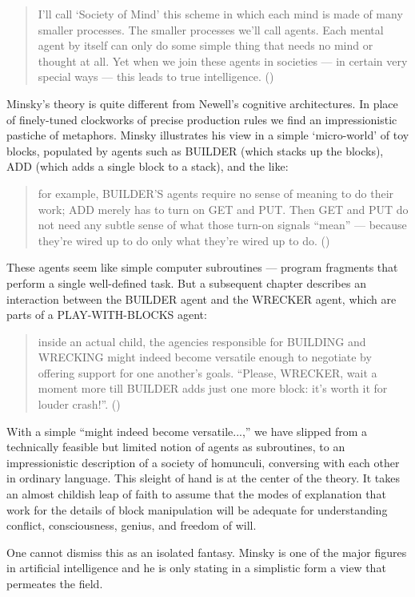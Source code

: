 \documentclass[12pt]{article}
\def\bq{\begin{quote}}
\def\eq{\end{quote}}
\begin{document}
\bq
I'll call `Society of Mind' this scheme in which each mind is made of many smaller processes. The smaller processes we'll call agents. Each mental agent by itself can only do some simple thing that needs no mind or thought at all. Yet when we join these agents in societies --- in certain very special ways --- this leads to true intelligence. ({\cite{minsky1986}})
\eq

Minsky's theory is quite different from Newell's cognitive architectures. In place of finely-tuned clockworks of precise production rules we find an impressionistic pastiche of metaphors. Minsky illustrates his view in a simple `micro-world' of toy blocks, populated by agents such as BUILDER (which stacks up the blocks), ADD (which adds a single block to a stack), and the like:

\bq
for example, BUILDER'S agents require no sense of meaning to do their work; ADD merely has to turn on GET and PUT. Then GET and PUT do not need any subtle sense of what those turn-on signals ``mean'' --- because they're wired up to do only what they're wired up to do. ({\it \cite{minsky1986}})
\eq

These agents seem like simple computer subroutines --- program fragments that perform a single well-defined task. But a subsequent chapter describes an interaction between the BUILDER agent and the WRECKER agent, which are parts of a PLAY-WITH-BLOCKS agent:

\bq
inside an actual child, the agencies responsible for BUILDING and WRECKING might indeed become versatile enough to negotiate by offering support for one another's goals. ``Please, WRECKER, wait a moment more till BUILDER adds just one more block: it's worth it for louder crash!''. ({\it \cite{minsky1986}})
\eq

With a simple ``might indeed become versatile...,'' we have slipped from a technically feasible but limited notion of agents as subroutines, to an impressionistic description of a society of homunculi, conversing with each other in ordinary language. This sleight of hand is at the center of the theory. It takes an almost childish leap of faith to assume that the modes of
explanation that work for the details of block manipulation will be adequate for understanding conflict, consciousness, genius, and freedom of will.

One cannot dismiss this as an isolated fantasy. Minsky is one of the major figures in artificial intelligence and he is only stating in a simplistic form a view that permeates the field.
\end{document}
